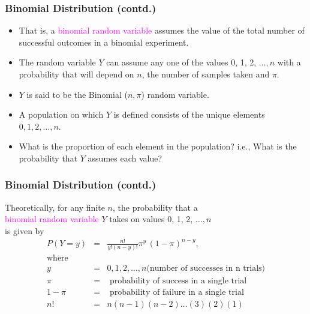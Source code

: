 \documentclass[xcolor=dvipsnames,12pt]{beamer}
\begin{document}
\begin{frame}
\frametitle{Binomial Distribution (contd.)}
\begin{itemize}
\addtolength{\itemsep}{-0.6\baselineskip}
\item That is, a \textcolor{magenta}{binomial random variable}  assumes the value of the
total number of successful outcomes in a binomial experiment.\\[.1in]
\item The random variable $Y$  can assume any one of the values 
0, 1, 2, $\ldots, n$ with a probability that
will depend on $n$, the number of samples  taken and $\pi$.\\[.1in]
\item $Y$ is said to be the Binomial ($n,\pi$) random variable.\\[.1in]
\item A population on which $Y$ is defined consists of the unique elements
$0,1,2,\ldots,n$. \\[.1in]
\item What is the proportion of each element in the population?
i.e., What is the probability that $Y$ assumes each value?
\end{itemize}
\end{frame}



\begin{frame}
\frametitle{Binomial Distribution (contd.)}
Theoretically, for any finite $n$, the probability that a\\
\textcolor{magenta}{binomial random variable} $Y$ takes on values 0, 1, 2, $\dots, n$\\ 
is given by\\
\begin{eqnarray*}
P(Y=y) & = & \frac{n!}{y!(n-y)!}\pi^y\,(1 - \pi)^{n-y}, \\
\mbox{where} & & \\
        y & = & 0, 1, 2, \ldots, n \mbox {(number of successes in n trials)}\\
\pi & = &  \mbox{ probability of success in a single trial}\\
1-\pi & = &  \mbox{ probability of failure in a single trial}\\
n! & = & n(n-1)(n-2) \ldots (3)(2)(1)
\end{eqnarray*}
\end{frame}
\end{document}
